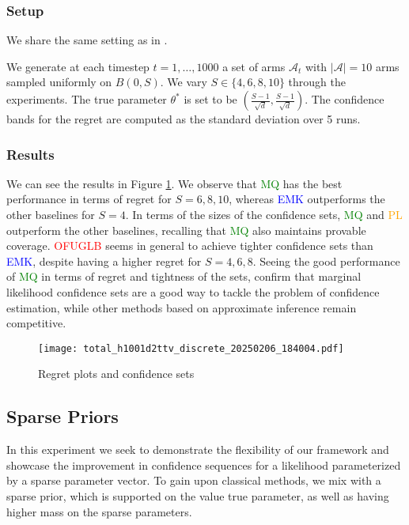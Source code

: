 \subsubsection{Setup} 

We share the same setting as in \citep{lee2024unified}.

We generate at each timestep $t = 1, \ldots, 1000$ a set of arms $\mathcal{A}_t$ with $| \mathcal{A} | = 10$ arms sampled uniformly on $B(0, S)$. We vary $S \in \{ 4, 6, 8, 10\}$ through the experiments.  The true parameter $\theta^*$ is set to be $(\frac{S-1}{\sqrt{d}}, \frac{S-1}{\sqrt{d}})$. The confidence bands for the regret are computed as the standard deviation over 5 runs.

\subsubsection{Results}
We can see the results in Figure \ref{fig:regret_and_confidence}. We observe that \textcolor{green}{MQ} has the best performance in terms of regret for $S = 6, 8, 10$, whereas \textcolor{blue}{EMK} outperforms the other baselines for $S = 4$. 
In terms of the sizes of the confidence sets, \textcolor{green}{MQ} and \textcolor{orange}{PL} outperform the other baselines, recalling that \textcolor{green}{MQ} also maintains provable coverage. 
\textcolor{red}{OFUGLB} seems in general to achieve tighter confidence sets than \textcolor{blue}{EMK}, despite having a higher regret for $S = 4, 6, 8$.
Seeing the good performance of \textcolor{green}{MQ} in terms of regret and tightness of the sets, confirm that marginal likelihood confidence sets are a good way to tackle the problem of confidence estimation, while other methods based on approximate inference remain competitive.

\begin{figure}[htp]
    \centering
    \texttt{[image: total\_h1001d2ttv\_discrete\_20250206\_184004.pdf]}
    \caption{Regret plots and confidence sets}
    \label{fig:regret_and_confidence}
\end{figure}



\subsection{Sparse Priors}
In this experiment we seek to demonstrate the flexibility of our framework and showcase the improvement in confidence sequences for a likelihood parameterized by a sparse parameter vector. To gain upon classical methods, we mix with a sparse prior, which is supported on the value true parameter, as well as having higher mass on the sparse parameters.

